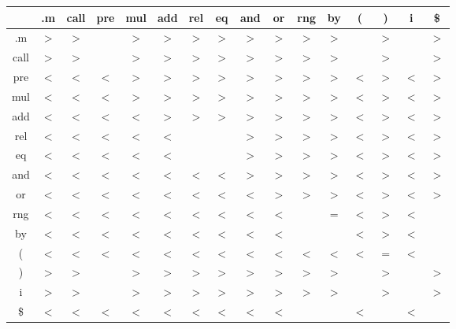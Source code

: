 \documentclass[11pt,a4paper]{article}
\begin{document}
\begin{tabular}{|c|c|c|c|c|c|c|c|c|c|c|c|c|c|c|c|}
\hline
 & .m & call & pre & mul & add & rel & eq & and & or & rng & by & ( & ) & i & \$ \\ \hline
.m & $>$ & $>$ &  & $>$ & $>$ & $>$ & $>$ & $>$ & $>$ & $>$ & $>$ &  & $>$ &  & $>$ \\ \hline
call & $>$ & $>$ &  & $>$ & $>$ & $>$ & $>$ & $>$ & $>$ & $>$ & $>$ &  & $>$ &  & $>$ \\ \hline
pre & $<$ & $<$ & $<$ & $>$ & $>$ & $>$ & $>$ & $>$ & $>$ & $>$ & $>$ & $<$ & $>$ & $<$ & $>$ \\ \hline
mul & $<$ & $<$ & $<$ & $>$ & $>$ & $>$ & $>$ & $>$ & $>$ & $>$ & $>$ & $<$ & $>$ & $<$ & $>$ \\ \hline
add & $<$ & $<$ & $<$ & $<$ & $>$ & $>$ & $>$ & $>$ & $>$ & $>$ & $>$ & $<$ & $>$ & $<$ & $>$ \\ \hline
rel & $<$ & $<$ & $<$ & $<$ & $<$ &  &  & $>$ & $>$ & $>$ & $>$ & $<$ & $>$ & $<$ & $>$ \\ \hline
eq & $<$ & $<$ & $<$ & $<$ & $<$ &  &  & $>$ & $>$ & $>$ & $>$ & $<$ & $>$ & $<$ & $>$ \\ \hline
and & $<$ & $<$ & $<$ & $<$ & $<$ & $<$ & $<$ & $>$ & $>$ & $>$ & $>$ & $<$ & $>$ & $<$ & $>$ \\ \hline
or & $<$ & $<$ & $<$ & $<$ & $<$ & $<$ & $<$ & $<$ & $>$ & $>$ & $>$ & $<$ & $>$ & $<$ & $>$ \\ \hline
rng & $<$ & $<$ & $<$ & $<$ & $<$ & $<$ & $<$ & $<$ & $<$ &  & $=$ & $<$ & $>$ & $<$ &  \\ \hline
by & $<$ & $<$ & $<$ & $<$ & $<$ & $<$ & $<$ & $<$ & $<$ &  &  & $<$ & $>$ & $<$ &  \\ \hline
( & $<$ & $<$ & $<$ & $<$ & $<$ & $<$ & $<$ & $<$ & $<$ & $<$ & $<$ & $<$ & $=$ & $<$ &  \\ \hline
) & $>$ & $>$ &  & $>$ & $>$ & $>$ & $>$ & $>$ & $>$ & $>$ & $>$ &  & $>$ &  & $>$ \\ \hline
i & $>$ & $>$ &  & $>$ & $>$ & $>$ & $>$ & $>$ & $>$ & $>$ & $>$ &  & $>$ &  & $>$ \\ \hline
\$ & $<$ & $<$ & $<$ & $<$ & $<$ & $<$ & $<$ & $<$ & $<$ &  &  & $<$ &  & $<$ &  \\ \hline
\end{tabular}


\end{document}
